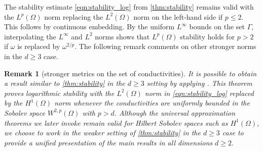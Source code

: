 \documentclass[pdflatex,sn-mathphys-num]{sn-jnl-preprint}
\theoremstyle{thmstyleone}%
\theoremstyle{thmstyletwo}%
\newtheorem{remark}{Remark}%
\theoremstyle{thmstylethree}%
\numberwithin{equation}{section}
\numberwithin{theorem}{section}
\begin{document}
The stability estimate \eqref{eqn:stability_log} from \cref{thm:stability} remains valid with the $L^p(\Omega)$ norm replacing the $L^2(\Omega)$ norm on the left-hand side if $p\leq 2$. This follows by continuous embedding. By the uniform $L^\infty$ bounds on the set $\Gamma$, interpolating the $L^\infty$ and $L^2$ norms shows that $L^p(\Omega)$ stability holds for $p>2$ if $\omega$ is replaced by $\omega^{2/p}$.
The following remark comments on other stronger norms in the $d\geq 3$ case.
\begin{remark}[stronger metrics on the set of conductivities]
    It is possible to obtain a result similar to \cref{thm:stability} in the $d\geq 3$ setting by applying \cite[Thm.~1.2, p.~4]{choulli2023comments}. This theorem proves logarithmic stability with the $L^2(\Omega)$ norm in \eqref{eqn:stability_log} replaced by the $H^1(\Omega)$ norm whenever the conductivities are uniformly bounded in the Sobolev space $W^{2,p}(\Omega)$ with $p>d$.  Although the universal approximation theorems we later invoke remain valid for Hilbert Sobolev spaces such as $H^1(\Omega)$, we choose to work in the weaker setting of \cref{thm:stability} in the $d\geq 3$ case to provide a unified presentation of the main results in all dimensions $d\geq 2$.
\end{remark}
\end{document}
